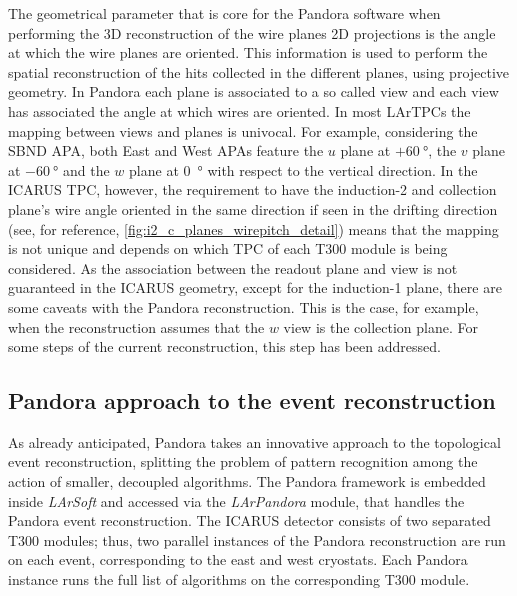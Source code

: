 The geometrical parameter that is core for the Pandora software when performing the 3D reconstruction of the wire planes 2D projections is the angle at which the wire planes are oriented. This information is used to perform the spatial reconstruction of the hits collected in the different planes, using projective geometry. In Pandora each plane is associated to a so called view and each view has associated the angle at which wires are oriented. In most LArTPCs the mapping between views and planes is univocal. For example, considering the SBND APA, both East and West APAs feature the $u$ plane at $+\SI{60}{\degree}$, the $v$ plane at $-\SI{60}{\degree}$ and the $w$ plane at \SI{0}{\degree} with respect to the vertical direction. In the ICARUS TPC, however, the requirement to have the induction-2 and collection plane's wire angle oriented in the same direction if seen in the drifting direction (see, for reference, \autoref{fig:i2_c_planes_wirepitch_detail}) means that the mapping is not unique and depends on which TPC of each T300 module is being considered. As the association between the readout plane and view is not guaranteed in the ICARUS geometry, except for the induction-1 plane, there are some caveats with the Pandora reconstruction. This is the case, for example, when the reconstruction assumes that the $w$ view is the collection plane. For some steps of the current reconstruction, this step has been addressed. 

\subsection{Pandora approach to the event reconstruction} \label{sec:Pandora}

As already anticipated, Pandora takes an innovative approach to the topological event reconstruction, splitting the problem of pattern recognition among the action of smaller, decoupled algorithms. The Pandora framework is embedded inside \emph{LArSoft} and accessed via the \emph{LArPandora} module, that handles the Pandora event reconstruction. The ICARUS detector consists of two separated T300 modules; thus, two parallel instances of the Pandora reconstruction are run on each event, corresponding to the east and west cryostats. Each Pandora instance runs the full list of algorithms on the corresponding T300 module. 

